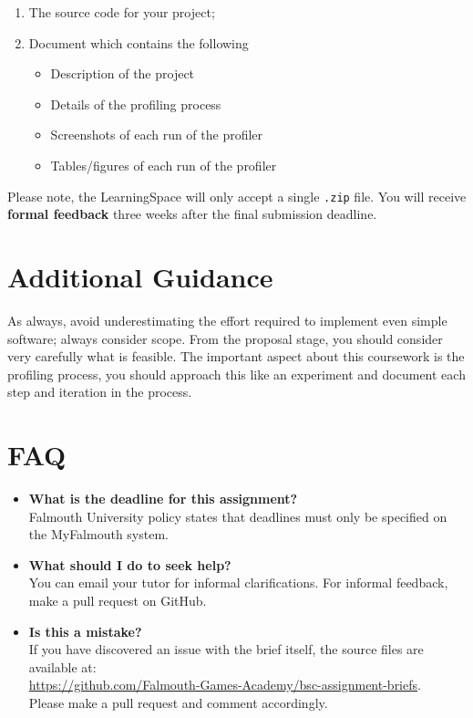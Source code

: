 \documentclass{../../fal_assignment}
\begin{document}
\begin{enumerate}[label=(\alph*)]
	\item The source code for your project;
	\item Document which contains the following
	\begin{itemize}
		\item Description of the project
		\item Details of the profiling process
		\item Screenshots of each run of the profiler
		\item Tables/figures of each run of the profiler
	\end{itemize}
\end{enumerate}

Please note, the LearningSpace will only accept a single \texttt{.zip} file. You will receive \textbf{formal feedback} three weeks after the final submission deadline.

\section*{Additional Guidance}

As always, avoid underestimating the effort required to implement even simple software; always consider scope.
From the proposal stage, you should consider very carefully what is feasible. The important aspect about this coursework is the profiling process, you should approach this like an experiment and document each step and iteration in the process.



\section*{FAQ}

\begin{itemize}
	\item 	\textbf{What is the deadline for this assignment?} \\ 
    		Falmouth University policy states that deadlines must only be specified on the MyFalmouth system.
    		
	\item 	\textbf{What should I do to seek help?} \\ 
    		You can email your tutor for informal clarifications. For informal feedback, make a pull request on GitHub. 
    		
    	\item 	\textbf{Is this a mistake?} \\ 	
    		If you have discovered an issue with the brief itself, the source files are available at: \\
    		\url{https://github.com/Falmouth-Games-Academy/bsc-assignment-briefs}.\\
    		 Please make a pull request and comment accordingly.
\end{itemize}
\end{document}
